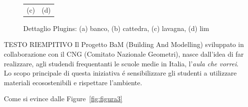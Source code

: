 \begin{figure}[htbp]
\begin{center}
\begin{tabular}{c @{\hspace{1em}} c}
 (c) & (d) \\
\end{tabular}
\end{center}
\caption{Dettaglio Plugins: (a) banco, (b) cattedra, (c) lavagna, (d) lim}\label{fig:figura2}
\end{figure}
\newpage

TESTO RIEMPITIVO
Il Progetto BaM (Building And Modelling) sviluppato in collaborazione con il CNG (Comitato Nazionale Geometri),
nasce dall'idea di far realizzare, agli studendi frequentanti le scuole medie in Italia,
l'\emph{aula che vorrei}. Lo scopo principale di questa iniziativa \'e sensibilizzare gli studenti a utilizzare
materiali ecosostenibili e rispettare l'ambiente.

Come si evince dalle Figure~\ref{fig:figura3}


